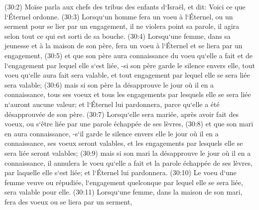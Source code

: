 \verse (30:2) Moïse parla aux chefs des tribus des enfants d`Israël, et dit: Voici ce que l`Éternel ordonne. 
\verse (30:3) Lorsqu`un homme fera un voeu à l`Éternel, ou un serment pour se lier par un engagement, il ne violera point sa parole, il agira selon tout ce qui est sorti de sa bouche. 
\verse (30:4) Lorsqu`une femme, dans sa jeunesse et à la maison de son père, fera un voeu à l`Éternel et se liera par un engagement, 
\verse (30:5) et que son père aura connaissance du voeu qu`elle a fait et de l`engagement par lequel elle s`est liée, -si son père garde le silence envers elle, tout voeu qu`elle aura fait sera valable, et tout engagement par lequel elle se sera liée sera valable; 
\verse (30:6) mais si son père la désapprouve le jour où il en a connaissance, tous ses voeux et tous les engagements par lesquels elle se sera liée n`auront aucune valeur; et l`Éternel lui pardonnera, parce qu`elle a été désapprouvée de son père. 
\verse (30:7) Lorsqu`elle sera mariée, après avoir fait des voeux, ou s`être liée par une parole échappée de ses lèvres, 
\verse (30:8) et que son mari en aura connaissance, -s`il garde le silence envers elle le jour où il en a connaissance, ses voeux seront valables, et les engagements par lesquels elle se sera liée seront valables; 
\verse (30:9) mais si son mari la désapprouve le jour où il en a connaissance, il annulera le voeu qu`elle a fait et la parole échappée de ses lèvres, par laquelle elle s`est liée; et l`Éternel lui pardonnera. 
\verse (30:10) Le voeu d`une femme veuve ou répudiée, l`engagement quelconque par lequel elle se sera liée, sera valable pour elle. 
\verse (30:11) Lorsqu`une femme, dans la maison de son mari, fera des voeux ou se liera par un serment, 
